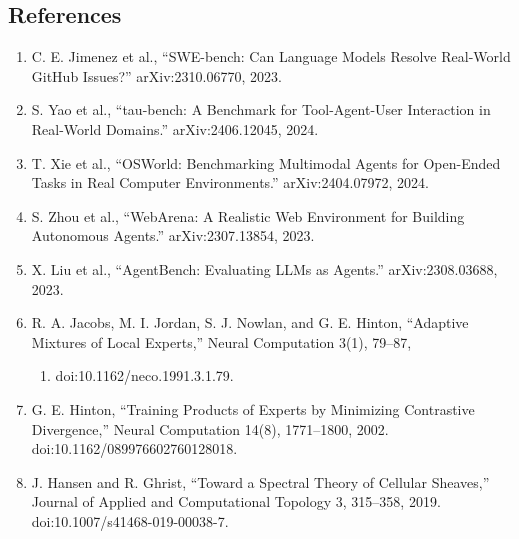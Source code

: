 \documentclass[
  11pt,
]{article}
\providecommand{\tightlist}{%
  \setlength{\itemsep}{0pt}\setlength{\parskip}{0pt}}
\theoremstyle{plain}
\theoremstyle{definition}\newtheorem{definition}[theorem]{Definition}
\theoremstyle{remark}\newtheorem*{remark}{Remark}
\begin{document}
\subsection{References}\label{references}

\begin{enumerate}
\def\labelenumi{\arabic{enumi}.}
\tightlist
\item
  C. E. Jimenez et al., ``SWE-bench: Can Language Models Resolve Real-World
  GitHub Issues?'' arXiv:2310.06770, 2023.
\item
  S. Yao et al., ``tau-bench: A Benchmark for Tool-Agent-User Interaction in
  Real-World Domains.'' arXiv:2406.12045, 2024.
\item
  T. Xie et al., ``OSWorld: Benchmarking Multimodal Agents for Open-Ended
  Tasks in Real Computer Environments.'' arXiv:2404.07972, 2024.
\item
  S. Zhou et al., ``WebArena: A Realistic Web Environment for Building
  Autonomous Agents.'' arXiv:2307.13854, 2023.
\item
  X. Liu et al., ``AgentBench: Evaluating LLMs as Agents.''
  arXiv:2308.03688, 2023.
\item
  R. A. Jacobs, M. I. Jordan, S. J. Nowlan, and G. E. Hinton,
  ``Adaptive Mixtures of Local Experts,'' Neural Computation 3(1), 79--87,

  \begin{enumerate}
  \def\labelenumii{\arabic{enumii}.}
  \setcounter{enumii}{1990}
  \tightlist
  \item
    doi:10.1162/neco.1991.3.1.79.
  \end{enumerate}
\item
  G. E. Hinton, ``Training Products of Experts by Minimizing Contrastive
  Divergence,'' Neural Computation 14(8), 1771--1800, 2002.
  doi:10.1162/089976602760128018.
\item
  J. Hansen and R. Ghrist, ``Toward a Spectral Theory of Cellular Sheaves,''
  Journal of Applied and Computational Topology 3, 315--358, 2019.
  doi:10.1007/s41468-019-00038-7.
\end{enumerate}
\end{document}
